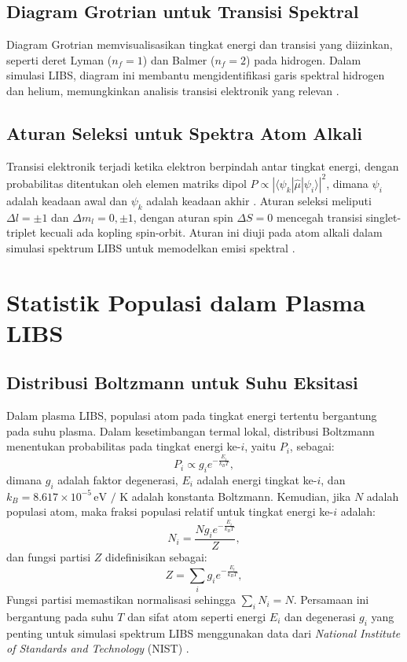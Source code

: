 \subsection{Diagram Grotrian untuk Transisi Spektral}
Diagram Grotrian memvisualisasikan tingkat energi dan transisi yang diizinkan, seperti deret Lyman (\( n_f = 1 \)) dan Balmer (\( n_f = 2 \)) pada hidrogen. Dalam simulasi LIBS, diagram ini membantu mengidentifikasi garis spektral hidrogen dan helium, memungkinkan analisis transisi elektronik yang relevan \citep{Mason2015}.

\subsection{Aturan Seleksi untuk Spektra Atom Alkali}
Transisi elektronik terjadi ketika elektron berpindah antar tingkat energi, dengan probabilitas ditentukan oleh elemen matriks dipol \( P \propto |\langle \psi_k | \hat{\mu} | \psi_i \rangle|^2 \), dimana \( \psi_i \) adalah keadaan awal dan \( \psi_k \) adalah keadaan akhir \citep{Demtroder2010}. Aturan seleksi meliputi \( \Delta l = \pm 1 \) dan \( \Delta m_l = 0, \pm 1 \), dengan aturan spin \( \Delta S = 0 \) mencegah transisi singlet-triplet kecuali ada kopling spin-orbit. Aturan ini diuji pada atom alkali dalam simulasi spektrum LIBS untuk memodelkan emisi spektral \citep{Griffiths2005}.

\section{Statistik Populasi dalam Plasma LIBS}

\subsection{Distribusi Boltzmann untuk Suhu Eksitasi}
Dalam plasma LIBS, populasi atom pada tingkat energi tertentu bergantung pada suhu plasma. Dalam kesetimbangan termal lokal, distribusi Boltzmann menentukan probabilitas pada tingkat energi ke-\( i \), yaitu \( P_i \), sebagai:
\begin{equation}
P_i \propto g_i e^{-\frac{E_i}{k_B T}}, \label{eq:boltzmann_propto}
\end{equation}
dimana \( g_i \) adalah faktor degenerasi, \( E_i \) adalah energi tingkat ke-\( i \), dan \( k_B = 8.617 \times 10^{-5} \, \text{eV / K} \) adalah konstanta Boltzmann. Kemudian, jika \( N \) adalah populasi atom, maka fraksi populasi relatif untuk tingkat energi ke-\( i \) adalah:
\begin{equation}
N_i = \frac{N g_i e^{-\frac{E_i}{k_B T}}}{Z}, \label{eq:boltzmann1}
\end{equation}
dan fungsi partisi \( Z \) didefinisikan sebagai:
\begin{equation}
Z = \sum_i g_i e^{-\frac{E_i}{k_B T}}, \label{eq:partition}
\end{equation}
Fungsi partisi memastikan normalisasi sehingga \( \sum_i N_i = N \). Persamaan ini bergantung pada suhu \( T \) dan sifat atom seperti energi \( E_i \) dan degenerasi \( g_i \) yang penting untuk simulasi spektrum LIBS menggunakan data dari \textit{National Institute of Standards and Technology} (NIST) \citep{Pathria2011,Rybicki1985}.


